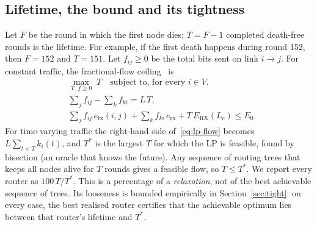 \subsection{Lifetime, the bound and its tightness}\label{sec:problem}
Let $F$ be the round in which the first node dies; $T=F-1$ completed death-free rounds is the lifetime. For example, if the first death happens during round 152, then $F=152$ and $T=151$. Let $f_{ij}\ge0$ be the total bits sent on link $i\to j$. For constant traffic, the fractional-flow ceiling~\cite{chang2004maximum} is
\begin{align}
&\max_{T,\,f\ge0}\; T \quad\text{subject to, for every } i\in V,\nonumber\\
&\textstyle\sum_j f_{ij}-\sum_k f_{ki} = L\,T,\label{eq:lp-flow}\\
&\textstyle\sum_j f_{ij}\,e_{\mathrm{tx}}(i,j)+\sum_k f_{ki}\,e_{\mathrm{rx}} + T\,E_{\mathrm{RX}}(L_c) \le E_0.\label{eq:lp-energy}
\end{align}
For time-varying traffic the right-hand side of~\eqref{eq:lp-flow} becomes $L\sum_{t<T}k_i(t)$, and $T^*$ is the largest $T$ for which the LP is feasible, found by bisection (an oracle that knows the future). Any sequence of routing trees that keeps all nodes alive for $T$ rounds gives a feasible flow, so $T\le T^*$. We report every router as $100\,T/T^*$. This is a percentage of a \emph{relaxation}, not of the best achievable sequence of trees. Its looseness is bounded empirically in Section~\ref{sec:tight}: on every case, the best realised router certifies that the achievable optimum lies between that router's lifetime and $T^*$.
